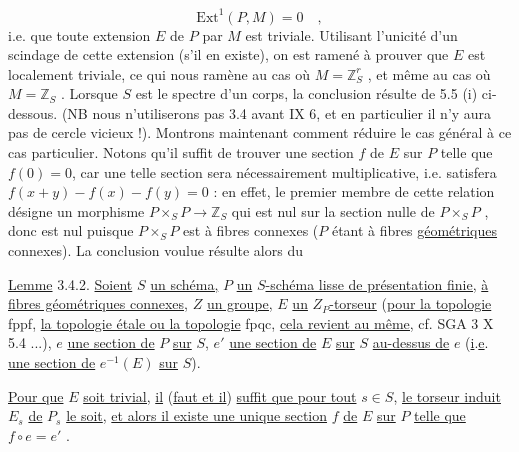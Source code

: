 \begin{equation*}
\mathrm{Ext}^1(P,M) = 0 \quad ,
\end{equation*}
i.e. que toute extension $E$ de $P$ par $M$ est triviale. Utilisant l'unicité d'un scindage de cette extension (s'il en existe), on est ramené à prouver que $E$ est localement triviale, ce qui nous ramène au cas où $M = \mathbb{Z}^{r}_{S}$ , et même au cas où $M = \mathbb{Z}_{S}$ . Lorsque $S$ est le spectre d'un corps, la conclusion résulte de 5.5 (i) ci-dessous. (NB nous n'utiliserons pas 3.4 avant IX 6, et en particulier il n'y aura pas de cercle vicieux !). Montrons maintenant comment réduire le cas général à ce cas particulier. Notons qu'il suffit de trouver une section $f$ de $E$ sur $P$ telle que $f(0) = 0$, car une telle section sera nécessairement multiplicative, i.e. satisfera $f(x+y)-f(x)-f(y) = 0$ : en effet, le premier membre de cette relation désigne un morphisme $P \times_{S} P \longrightarrow \mathbb{Z}_{S}$ qui est nul sur la section nulle de $P \times_{S} P$ , donc est nul puisque $P \times_{S} P$ est à fibres connexes ($P$ étant à fibres \underline{géométriques} connexes). La conclusion voulue résulte alors du

\underline{Lemme} 3.4.2. \underline{Soient} $S$ \underline{un schéma,} $P$ \underline{un} \underline{$S$-schéma lisse de présentation finie,} \underline{à fibres géométriques connexes,} $Z$ \underline{un groupe,} $E$ \underline{un} $Z_{P}$\underline{-torseur} (\underline{pour la topologie} fppf, \underline{la topologie étale ou la topologie} fpqc, \underline{cela revient au même,} cf. SGA 3 X 5.4 ...), $e$ \underline{une section de} $P$ \underline{sur} $S$, $e'$ \underline{une section de} $E$ \underline{sur} $S$ \underline{au-dessus de} $e$ (\underline{i}.\underline{e}. \underline{une section de} $e^{-1}(E)$ \underline{sur} $S$).



\underline{Pour que} $E$ \underline{soit trivial,} \underline{il} (\underline{faut et il}) \underline{suffit que pour tout} $s \in S$, \underline{le torseur induit} $E_{s}$ \underline{de} $P_{s}$ \underline{le soit}, \underline{et alors il existe une unique section} $f$ \underline{de} $E$ \underline{sur} $P$ \underline{telle que} $f \circ e = e'$ .

